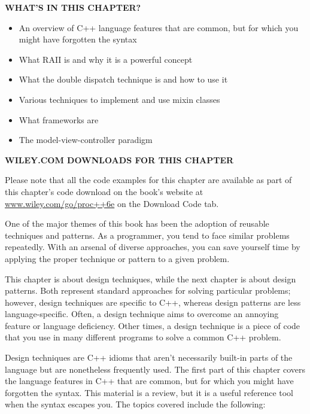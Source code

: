 \noindent
\textbf{WHAT’S IN THIS CHAPTER?}

\begin{itemize}
\item
An overview of C++ language features that are common, but for which you might have forgotten the syntax

\item
What RAII is and why it is a powerful concept

\item
What the double dispatch technique is and how to use it

\item
Various techniques to implement and use mixin classes

\item
What frameworks are

\item
The model-view-controller paradigm
\end{itemize}

\noindent
\textbf{WILEY.COM DOWNLOADS FOR THIS CHAPTER}

Please note that all the code examples for this chapter are available as part of this chapter’s code download on the book’s website at \url{www.wiley.com/go/proc++6e} on the Download Code tab.

One of the major themes of this book has been the adoption of reusable techniques and patterns. As a programmer, you tend to face similar problems repeatedly. With an arsenal of diverse approaches, you can save yourself time by applying the proper technique or pattern to a given problem.

This chapter is about design techniques, while the next chapter is about design patterns. Both represent standard approaches for solving particular problems; however, design techniques are specific to C++, whereas design patterns are less language-specific. Often, a design technique aims to overcome an annoying feature or language deficiency. Other times, a design technique is a piece of code that you use in many different programs to solve a common C++ problem.

Design techniques are C++ idioms that aren’t necessarily built-in parts of the language but are nonetheless frequently used. The first part of this chapter covers the language features in C++ that are common, but for which you might have forgotten the syntax. This material is a review, but it is a useful reference tool when the syntax escapes you. The topics covered include the following:

